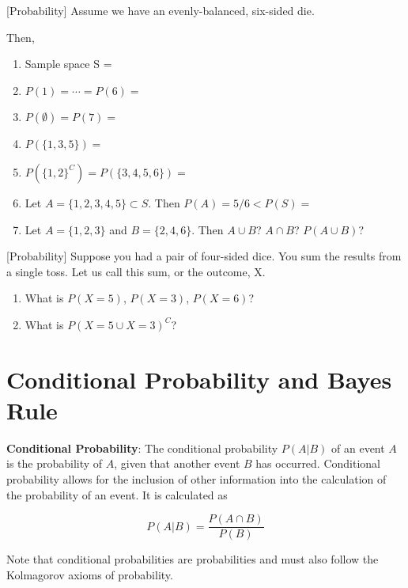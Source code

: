 \documentclass[]{book}
\providecommand{\tightlist}{%
  \setlength{\itemsep}{0pt}\setlength{\parskip}{0pt}}
\theoremstyle{definition}
\theoremstyle{definition}
\theoremstyle{definition}
\theoremstyle{remark}
\begin{document}
[Probability]
\protect\hypertarget{exm:prob}{}{\label{exm:prob} {} }
Assume we have an evenly-balanced, six-sided die.

Then,

\begin{enumerate}
\def\labelenumi{\arabic{enumi}.}
\tightlist
\item
  Sample space S =
\item
  \(P(1)=\cdots=P(6)=\)
\item
  \(P(\emptyset)=P(7)=\)
\item
  \(P\left( \{ 1, 3, 5 \} \right)=\)
\item
  \(P\left( \{ 1, 2 \}^C \right)= P\left( \{ 3, 4, 5, 6 \}\right)=\)
\item
  Let \(A=\{ 1,2,3,4,5 \}\subset S\). Then \(P(A)=5/6<P(S)=\)
\item
  Let \(A=\{ 1, 2, 3 \}\) and \(B=\{ 2, 4, 6 \}\). Then \(A\cup B\)? \(A\cap B\)? \(P(A \cup B)\)?
\end{enumerate}

[Probability]
\protect\hypertarget{exr:prob1}{}{\label{exr:prob1} {} }
Suppose you had a pair of four-sided dice. You sum the results from a single toss. Let us call this sum, or the outcome, X.

\begin{enumerate}
\def\labelenumi{\arabic{enumi}.}
\item
  What is \(P(X = 5)\), \(P(X = 3)\), \(P(X = 6)\)?
\item
  What is \(P(X=5 \cup X = 3)^C\)?
\end{enumerate}

\hypertarget{conditional-probability-and-bayes-rule}{%
\section{Conditional Probability and Bayes Rule}\label{conditional-probability-and-bayes-rule}}

\textbf{Conditional Probability}: The conditional probability \(P(A|B)\) of an event \(A\) is the probability of \(A\), given that another event \(B\) has occurred. Conditional probability allows for the inclusion of other information into the calculation of the probability of an event. It is calculated as

\[P(A|B)=\frac{P(A\cap B)}{P(B)}\]

Note that conditional probabilities are probabilities and must also follow the Kolmagorov axioms of probability.
\end{document}
